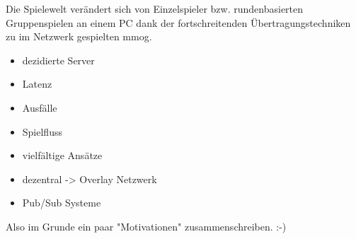 Die Spielewelt verändert sich von Einzelspieler bzw. rundenbasierten Gruppenspielen an einem PC dank der fortschreitenden Übertragungstechniken zu im Netzwerk gespielten \ac{mmog}.

\begin{itemize}
\item dezidierte Server
\item Latenz
\item Ausfälle
\item Spielfluss
\end{itemize}

\begin{itemize}
\item vielfältige Ansätze \cite{Bharambe2008Donnybrook} %
\item dezentral -> Overlay Netzwerk
\item Pub/Sub Systeme \cite{Knutsson2004Peertopeer} %
\end{itemize}

Also im Grunde ein paar "Motivationen" zusammenschreiben. :-)
